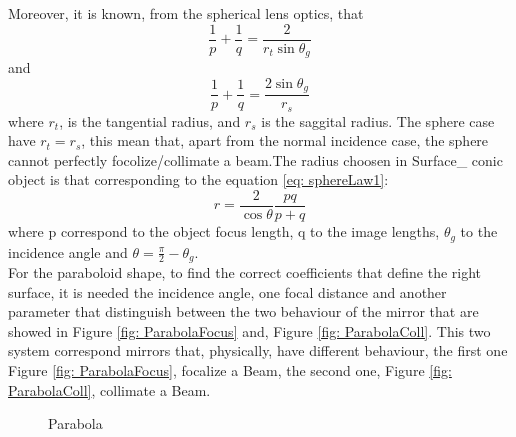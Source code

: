 Moreover, it is known, from the spherical lens optics, that
\begin{equation}
\frac{1}{p} + \frac{1}{q} = \frac{2}{r_t \sin \theta_g}
\label{eq: sphereLaw1}
\end{equation}
and
\begin{equation}
\frac{1}{p} + \frac{1}{q} = \frac{2 \sin \theta_g}{r_s}
\label{eq: sphereLaw2}
\end{equation}
where $r_t $, is the tangential radius, and $r_s $ is the saggital radius. The sphere case have $r_t = r_s $, this mean that, apart from the normal incidence case, the sphere cannot perfectly focolize/collimate a beam.The radius choosen in Surface\_ conic object is that corresponding to the equation \ref{eq: sphereLaw1}: 
\begin{equation}
r = \frac{2}{\cos \theta} \frac{pq}{p + q}
\end{equation}
where p correspond to the object focus length, q to the image lengths, $\theta_g $ to the incidence angle and $\theta = \frac{\pi}{2} - \theta_g $.
\\
For the paraboloid shape, to find the correct coefficients that define the right surface, it is needed the incidence angle, one focal distance and another parameter that distinguish between the two behaviour of the mirror that are showed in Figure \ref{fig: ParabolaFocus} and, Figure \ref{fig: ParabolaColl}. This two system correspond mirrors that, physically, have different behaviour, the first one Figure \ref{fig: ParabolaFocus}, focalize a Beam, the second one, Figure \ref{fig: ParabolaColl}, collimate a Beam.
\begin{figure}[H]
%
\centering
%
\quad
%
%
\caption{Parabola}
\label{fig :p3}
\end{figure}
